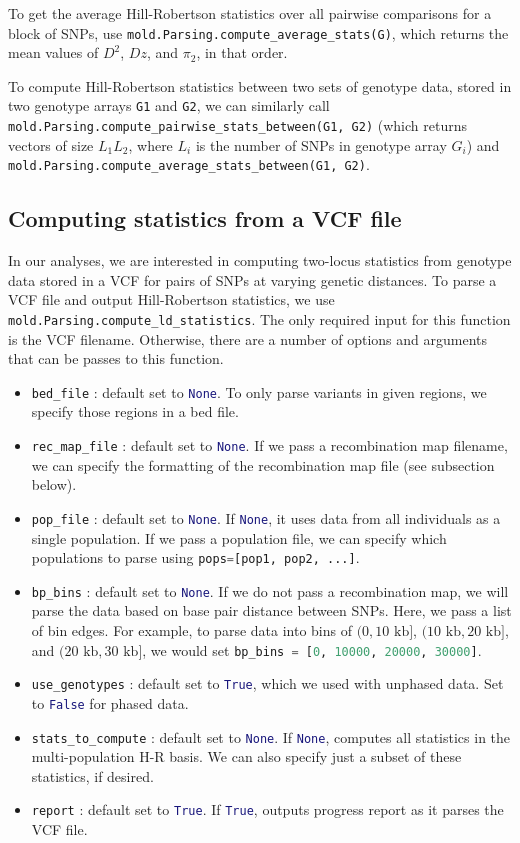 \documentclass[11pt]{article}
\makeatletter
\newcommand{\py}[1]{\lstinline[breaklines=true,language=Python, showstringspaces=False]@#1@}
\makeatother
\begin{document}
To get the average Hill-Robertson statistics over all pairwise comparisons for a block of SNPs, use \py{mold.Parsing.compute_average_stats(G)}, which returns the mean values of $D^2$, $Dz$, and $\pi_2$, in that order.

To compute Hill-Robertson statistics between two sets of genotype data, stored in two genotype arrays \py{G1} and \py{G2}, we can similarly call \py{mold.Parsing.compute_pairwise_stats_between(G1, G2)} (which returns vectors of size $L_1L_2$, where $L_i$ is the number of SNPs in genotype array $G_i$) and \py{mold.Parsing.compute_average_stats_between(G1, G2)}.


\subsection{Computing statistics from a VCF file}

In our analyses, we are interested in computing two-locus statistics from genotype data stored in a VCF for pairs of SNPs at varying genetic distances.
To parse a VCF file and output Hill-Robertson statistics, we use \py{mold.Parsing.compute_ld_statistics}.
The only required input for this function is the VCF filename.
Otherwise, there are a number of options and arguments that can be passes to this function.
\begin{itemize}
\item \py{bed_file} : default set to \py{None}. To only parse variants in given regions, we specify those regions in a bed file.
\item \py{rec_map_file} : default set to \py{None}. If we pass a recombination map filename, we can specify the formatting of the recombination map file (see subsection below).
\item \py{pop_file} : default set to \py{None}. If \py{None}, it uses data from all individuals as a single population. If we pass a population file, we can specify which populations to parse using \py{pops=[pop1, pop2, ...]}.
\item \py{bp_bins} : default set to \py{None}. If we do not pass a recombination map, we will parse the data based on base pair distance between SNPs. Here, we pass a list of bin edges. For example, to parse data into bins of $(0,10\text{ kb}]$, $(10\text{ kb},20\text{ kb}]$, and $(20\text{ kb},30\text{ kb}]$, we would set \py{bp_bins = [0, 10000, 20000, 30000]}.
\item \py{use_genotypes} : default set to \py{True}, which we used with unphased data. Set to \py{False} for phased data.
\item \py{stats_to_compute} : default set to \py{None}. If \py{None}, computes all statistics in the multi-population H-R basis. We can also specify just a subset of these statistics, if desired.
\item \py{report} : default set to \py{True}. If \py{True}, outputs progress report as it parses the VCF file.
\end{itemize}
\end{document}
